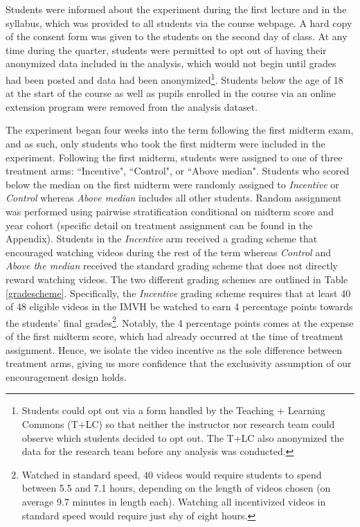 \documentclass[12pt]{article}
\begin{document}
Students were informed about the experiment during the first lecture and in the syllabus, which was provided to all students via the course webpage. A hard copy of the consent form was given to the students on the second day of class.  At any time during the quarter, students were permitted to opt out of having their anonymized data included in the analysis, which would not begin until grades had been posted and data had been anonymized\footnote{Students could opt out via a form handled by the Teaching + Learning Commons (T+LC) so that neither the instructor nor research team could observe which students decided to opt out. The T+LC also anonymized the data for the research team before any analysis was conducted.}. Students below the age of 18 at the start of the course as well as pupils enrolled in the course via an online extension program were removed from the analysis dataset.

The experiment began four weeks into the term following the first midterm exam, and as such, only students who took the first midterm were included in the experiment. Following the first midterm, students were assigned to one of three treatment arms: ``Incentive", ``Control", or ``Above median". Students who scored below the median on the first midterm were randomly assigned to \textit{Incentive} or \textit{Control} whereas \textit{Above median} includes all other students. Random assignment was performed using pairwise stratification conditional on midterm score and year cohort (specific detail on treatment assignment can be found in the Appendix). Students in the \textit{Incentive} arm received a grading scheme that encouraged watching videos during the rest of the term whereas \textit{Control} and \textit{Above the median} received the standard grading scheme that does not directly reward watching videos. The two different grading schemes are outlined in Table \ref{gradescheme}. Specifically, the \textit{Incentive} grading scheme requires that at least 40 of 48 eligible videos in the IMVH be watched to earn 4 percentage points towards the students' final grades\footnote{Watched in standard speed, 40 videos would require students to spend between 5.5 and 7.1 hours, depending on the length of videos chosen (on average 9.7 minutes in length each). Watching all incentivized videos in standard speed would require just shy of eight hours.}.
Notably, the 4 percentage points comes at the expense of the first midterm score, which had already occurred at the time of treatment assignment. Hence, we isolate the video incentive as the sole difference between treatment arms, giving us more confidence that the exclusivity assumption of our encouragement design holds. %
\end{document}
